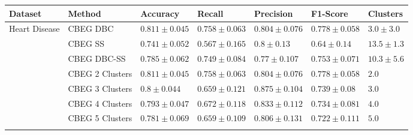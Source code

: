 \documentclass[12pt,a4paper]{standalone}
\begin{document}
\begin{tabular}{lllllll}
    \toprule
    \textbf{Dataset}                & \textbf{Method}   & \textbf{Accuracy}                            & \textbf{Recall}                               & \textbf{Precision}                            & \textbf{F1-Score}                             & \textbf{Clusters} \\ \midrule
    \multirow{11}{*}{Heart Disease} & CBEG DBC          & \cellcolor{gray!50}$0.811 \pm 0.045$         & \cellcolor{gray!50}$0.758 \pm 0.063$          & $0.804 \pm 0.076$                             & \cellcolor{gray!50}$0.778 \pm 0.058$          & $3.0 \pm 3.0$ \\ \nopagebreak
                                    & CBEG SS           & $0.741 \pm 0.052$                            & $0.567 \pm 0.165$                             & $0.8 \pm 0.13$                                & $0.64 \pm 0.14$                               & $13.5 \pm 1.3$ \\ \nopagebreak
                                    & CBEG DBC-SS       & $0.785 \pm 0.062$                            & $0.749 \pm 0.084$                             & $0.77 \pm 0.107$                              & $0.753 \pm 0.071$                             & $10.3 \pm 5.6$ \\ \nopagebreak
                                    & CBEG 2 Clusters   & \cellcolor{gray!50}$0.811 \pm 0.045$         & \cellcolor{gray!50}$0.758 \pm 0.063$          & $0.804 \pm 0.076$                             & \cellcolor{gray!50}$0.778 \pm 0.058$          & $2.0$ \\ \nopagebreak
                                    & CBEG 3 Clusters   & $0.8 \pm 0.044$                              & $0.659 \pm 0.121$                             & \cellcolor{gray!50}$\mathbf{0.875 \pm 0.104}$ & $0.739 \pm 0.08$                              & $3.0$ \\ \nopagebreak
                                    & CBEG 4 Clusters   & $0.793 \pm 0.047$                            & $0.672 \pm 0.118$                             & $0.833 \pm 0.112$                             & $0.734 \pm 0.081$                             & $4.0$ \\ \nopagebreak
                                    & CBEG 5 Clusters   & $0.781 \pm 0.069$                            & $0.659 \pm 0.109$                             & $0.806 \pm 0.131$                             & $0.722 \pm 0.111$                             & $5.0$ \\ \cmidrule{2-7}

\end{tabular}
\end{document}
